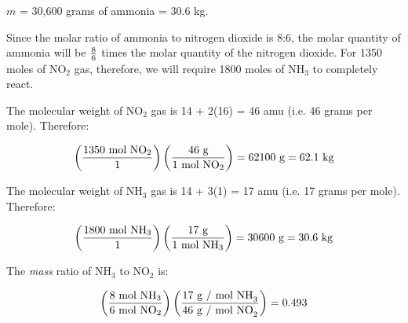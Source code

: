 \vskip 10pt

$m$ = 30,600 grams of ammonia = 30.6 kg.







Since the molar ratio of ammonia to nitrogen dioxide is 8:6, the molar quantity of ammonia will be $8 \over 6$ times the molar quantity of the nitrogen dioxide.  For 1350 moles of NO$_{2}$ gas, therefore, we will require 1800 moles of NH$_{3}$ to completely react.

\vskip 10pt

The molecular weight of NO$_{2}$ gas is 14 + 2(16) = 46 amu (i.e. 46 grams per mole).  Therefore:

$$\left( {1350 \hbox{ mol NO}_2 \over 1} \right) \left( {46 \hbox{ g} \over 1 \hbox{ mol NO}_2} \right) = 62100 \hbox{ g} = 62.1 \hbox{ kg}$$

\vskip 10pt

The molecular weight of NH$_{3}$ gas is 14 + 3(1) = 17 amu (i.e. 17 grams per mole).  Therefore:

$$\left( {1800 \hbox{ mol NH}_3 \over 1} \right) \left( {17 \hbox{ g} \over 1 \hbox{ mol NH}_3} \right) = 30600 \hbox{ g} = 30.6 \hbox{ kg}$$

\vskip 10pt

The {\it mass} ratio of NH$_{3}$ to NO$_{2}$ is:

$$\left( 8 \hbox{ mol NH}_3 \over 6 \hbox{ mol NO}_2 \right) \left( 17 \hbox{ g / mol NH}_3 \over 46 \hbox{ g / mol NO}_2 \right) = 0.493$$





